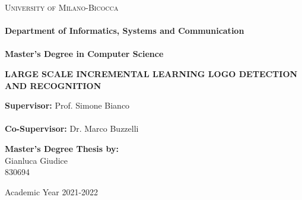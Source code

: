 \documentclass[corpo=11pt,english,numerazioneromana]{toptesi}
\begin{document}
\english



\begin{titlepage}
  \noindent
	\begin{minipage}[t]{0.21\textwidth}
	\end{minipage}
	\begin{minipage}[t]{0.79\textwidth}
	{
{\textsc{University of Milano-Bicocca}} \\\\
\textbf{Department of Informatics, Systems and Communication} \\\\
\textbf{Master's Degree in Computer Science} \\
	\par
	}
	\end{minipage}
	\vspace{25mm}
	\begin{center}{\Huge{\textbf{LARGE SCALE INCREMENTAL LEARNING LOGO DETECTION AND RECOGNITION}\par}}
	\end{center}        
	\vspace{25mm}
	\noindent
	{\large \textbf{Supervisor:} Prof. Simone Bianco} \\\\
	{\large \textbf{Co-Supervisor:} Dr. Marco Buzzelli} \\        
	\vspace{20mm}
	\begin{flushright}
		{\large \textbf{Master's Degree Thesis by:}} \\
		\vspace{2mm}
		\large{Gianluca Giudice} \\
		\vspace{2mm}
		\large{830694}
		
	\end{flushright}
	\vspace{25mm}
	\begin{center}
		{\large{Academic Year 2021-2022}}
	\end{center}
\end{titlepage}
	

\end{document}
